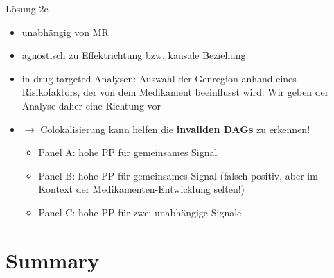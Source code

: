 \documentclass{beamer}
\begin{document}
\begin{frame}{Lösung 2c}

\begin{itemize}
    \item unabhängig von MR
    \item agnostisch zu Effektrichtung bzw. kausale Beziehung
    \item in drug-targeted Analysen: Auswahl der Genregion anhand eines Risikofaktors, der von dem Medikament beeinflusst wird. Wir geben der Analyse daher eine Richtung vor 
    \item $\rightarrow$ Colokalisierung kann helfen die \textbf{invaliden DAGs} zu erkennen!
    \begin{itemize}
        \item Panel A: hohe PP für gemeinsames Signal  
        \item Panel B: hohe PP für gemeinsames Signal (falsch-positiv, aber im Kontext der Medikamenten-Entwicklung selten!)
        \item Panel C: hohe PP für zwei unabhängige Signale 
    \end{itemize}
\end{itemize}

\end{frame}

\section{Summary}
\end{document}
